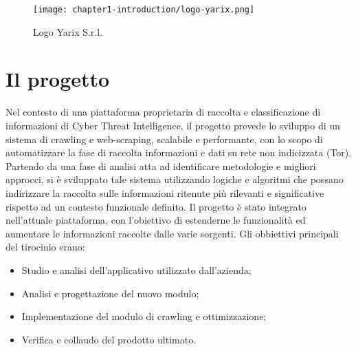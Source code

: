 \begin{figure}[!h] 
    \centering 
    \texttt{[image: chapter1-introduction/logo-yarix.png]} 
    \caption{Logo Yarix S.r.l.}
\end{figure}

\section{Il progetto}

Nel contesto di una piattaforma proprietaria di raccolta e classificazione di informazioni di Cyber Threat Intelligence, il progetto prevede lo sviluppo di un sistema di crawling e web-scraping, scalabile e performante, con lo scopo di automatizzare la fase di raccolta informazioni e dati su rete non indicizzata (Tor). Partendo da una fase di analisi atta ad identificare metodologie e migliori approcci, si è sviluppato tale sistema utilizzando logiche e algoritmi che possano indirizzare la raccolta sulle informazioni ritenute più rilevanti e significative rispetto ad un contesto funzionale definito.\newline{}
Il progetto è stato integrato nell'attuale piattaforma, con l'obiettivo di estenderne le funzionalità ed aumentare le informazioni raccolte dalle varie sorgenti.\newline{} Gli obbiettivi principali del tirocinio erano: \newline{}
\begin{itemize}
	\item Studio e analisi dell'applicativo utilizzato dall’azienda;
	\item Analisi e progettazione del nuovo modulo;
	\item Implementazione del modulo di crawling e ottimizzazione;
	\item Verifica e collaudo del prodotto ultimato.
\end{itemize}
